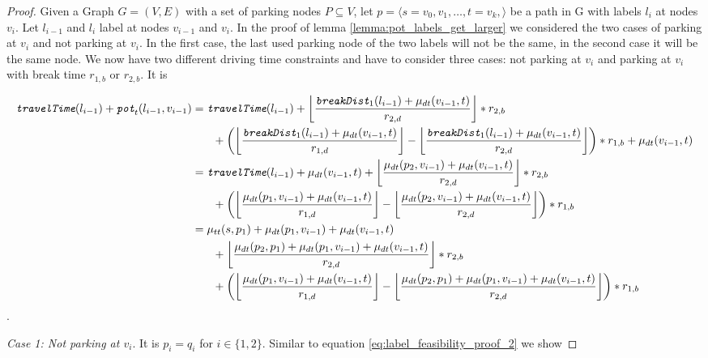 \begin{proof}
	Given a Graph $G=(V,E)$ with a set of parking nodes $P \subseteq V$, let $p = \langle s=v_0,v_1,\ldots,t=v_k, \rangle$ be a path in G with labels $l_i$ at nodes $v_i$. Let $l_{i-1}$ and $l_{i}$ label at nodes $v_{i-1}$ and $v_i$. In the proof of lemma \ref{lemma:pot_labels_get_larger} we considered the two cases of parking at $v_i$ and not parking at $v_i$. In the first case, the last used parking node of the two labels will not be the same, in the second case it will be the same node. We now have two different driving time constraints and have to consider three cases: not parking at $v_i$ and parking at $v_i$ with break time $r_{1,b}$ or $r_{2,b}$. It is

	\begin{align}
		\begin{split}\label{eq:label_2_feasibility_proof_1}
			\concretett(l_{i-1}) + \concretepotential_t(l_{i-1},v_{i-1}) &= \concretett(l_{i-1}) + \floor*{ \frac{\breakDist_1(l_{i-1}) + \drivingtime(v_{i-1},t)}{\restr_{2,d}} } * \restr_{2,b}\\
			& \phantom{{}=1} + \left(\floor*{\frac{\breakDist_1(l_{i-1}) + \drivingtime(v_{i-1},t)}{\restr_{1,d}} } - \floor*{\frac{\breakDist_1(l_{i-1}) + \drivingtime(v_{i-1},t)}{\restr_{2,d}} }\right) * \restr_{1,b} + \drivingtime(v_{i-1},t)\\
			&= \concretett(l_{i-1}) + \drivingtime(v_{i-1},t) + \floor*{ \frac{\drivingtime(p_2,v_{i-1}) + \drivingtime(v_{i-1},t)}{\restr_{2,d}} } * \restr_{2,b}\\
			& \phantom{{}=1}+ \left( \floor*{ \frac{\drivingtime(p_1,v_{i-1})  + \drivingtime(v_{i-1},t)}{\restr_{1,d}} } - \floor*{ \frac{\drivingtime(p_2,v_{i-1}) + \drivingtime(v_{i-1},t)}{\restr_{2,d}} }\right) * \restr_{1,b}\\
			&= \traveltime(s, p_1) + \drivingtime(p_1,v_{i-1}) + \drivingtime(v_{i-1},t)\\
			& \phantom{{}=1} + \floor*{ \frac{\drivingtime(p_2,p_1) + \drivingtime(p_1,v_{i-1}) + \drivingtime(v_{i-1},t)}{\restr_{2,d}} } * \restr_{2,b}\\
			& \phantom{{}=1} + \left( \floor*{ \frac{\drivingtime(p_1,v_{i-1})  + \drivingtime(v_{i-1},t)}{\restr_{1,d}} } - \floor*{ \frac{\drivingtime(p_2,p_1) + \drivingtime(p_1,v_{i-1}) + \drivingtime(v_{i-1},t)}{\restr_{2,d}} }\right) * \restr_{1,b}
		\end{split}
	\end{align}.

	\emph{Case 1: Not parking at $v_i$}. It is $p_i=q_i$ for $i \in \{1,2\}$. Similar to equation \ref{eq:label_feasibility_proof_2} we show


\end{proof}
